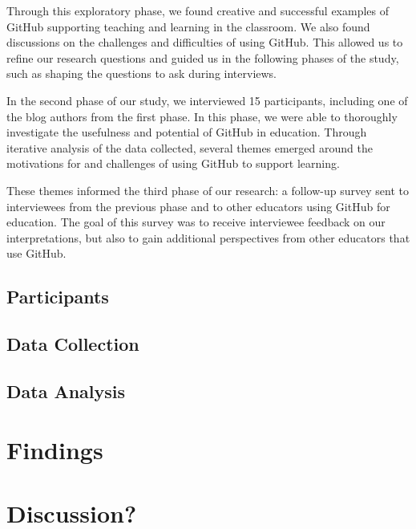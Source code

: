 Through this exploratory phase, we found creative and successful examples of GitHub supporting teaching and learning in the classroom. We also found discussions on the challenges and difficulties of using GitHub. This allowed us to refine our research questions and guided us in the following phases of the study, such as shaping the questions to ask during interviews.

In the second phase of our study, we interviewed 15 participants, including one of the blog authors from the first phase. In this phase, we were able to thoroughly investigate the usefulness and potential of GitHub in education. Through iterative analysis of the data collected, several themes emerged around the motivations for and challenges of using GitHub to support learning.

These themes informed the third phase of our research: a follow-up survey sent to interviewees from the previous phase and to other educators using GitHub for education. The goal of this survey was to receive interviewee feedback on our interpretations, but also to gain additional perspectives from other educators that use GitHub.

\subsection{Participants}

\subsection{Data Collection}

\subsection{Data Analysis}

\section{Findings}

\section{Discussion?}
